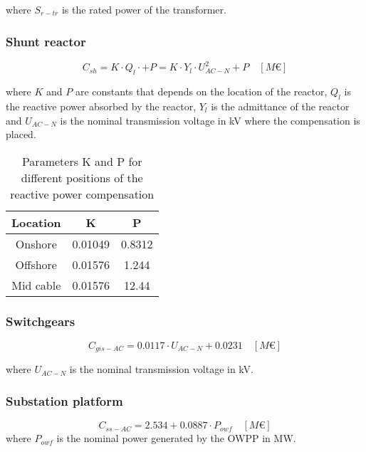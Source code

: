 \documentclass[a4paper,11pt, titlepage, twoside]{article}
\begin{document}
where $S_{r-tr}$ is the rated power of the transformer.
\subsubsection{Shunt reactor}

\begin{equation}\label{eq:shuntcost}
    C_{sh}= K \cdot Q_l \cdot + P = K \cdot Y_l\cdot U_{AC-N}^2 + P \quad \left[M\euro\right]
\end{equation}

where $K$ and $P$ are constants that depends on the location of the reactor, $Q_l$ is the reactive power absorbed by the reactor, $Y_l$ is the admittance of the reactor and $U_{AC-N}$ is the nominal transmission voltage in kV where the compensation is placed.

\begin{table}[h]
    \centering
    \begin{tabular}{c|c|c}
    \hline
    \textbf{Location} & \textbf{K} & \textbf{P} \\
    \hline
    Onshore & 0.01049 & 0.8312  \\
    Offshore & 0.01576 & 1.244 \\
    Mid cable & 0.01576 & 12.44 \\
    \hline
    \end{tabular}
    \caption{Parameters K and P for different positions of the reactive power compensation \cite{paperbase}}
    \label{tab:parametersshunt}
    \end{table}
\subsubsection{Switchgears}

\begin{equation}
    C_{gis-AC} = 0.0117 \cdot U_{AC-N} + 0.0231 \quad \left[M\euro\right]
\end{equation}

where $U_{AC-N}$ is the nominal transmission voltage in kV.
\subsubsection{Substation platform}

\begin{equation}
    C_{ss-AC} = 2.534 + 0.0887 \cdot P_{owf} \quad \left[M\euro\right]
\end{equation}
where $P_{owf}$ is the nominal power generated by the OWPP in MW.
\end{document}
